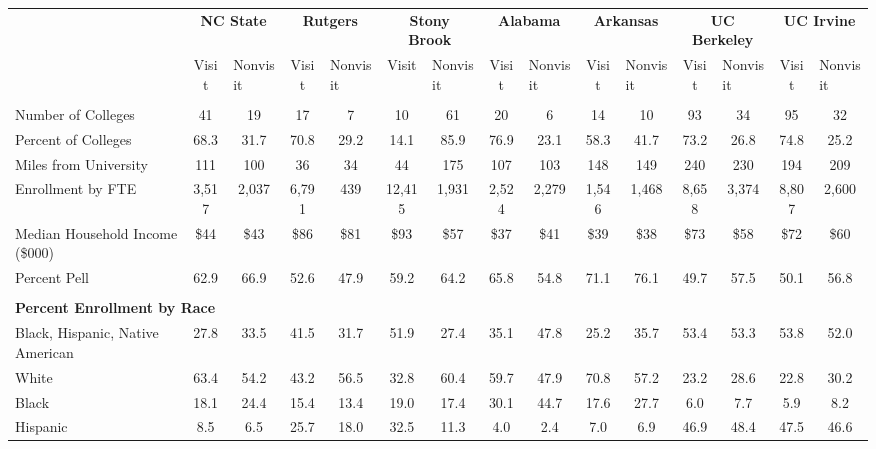 \begin{tabular*}{\linewidth}{@{\extracolsep{\fill} } lcccccccccccccc}%
&\multicolumn{2}{c}{\bfseries NC State}&\multicolumn{2}{c}{\bfseries Rutgers}&\multicolumn{2}{c}{\bfseries Stony Brook}&\multicolumn{2}{c}{\bfseries Alabama}&\multicolumn{2}{c}{\bfseries Arkansas}&\multicolumn{2}{c}{\bfseries UC Berkeley}&\multicolumn{2}{c}{\bfseries UC Irvine}\\%
&Visit&\multicolumn{1}{l}{Nonvisit}&Visit&\multicolumn{1}{l}{Nonvisit}&Visit&\multicolumn{1}{l}{Nonvisit}&Visit&\multicolumn{1}{l}{Nonvisit}&Visit&\multicolumn{1}{l}{Nonvisit}&Visit&\multicolumn{1}{l}{Nonvisit}&Visit&\multicolumn{1}{l}{Nonvisit}\\%
\hline%
&&&&&&&&&&&&&&\\%
\hspace{0cm}Number of Colleges&41&19&17&7&10&61&20&6&14&10&93&34&95&32\\%
Percent of Colleges&68.3&31.7&70.8&29.2&14.1&85.9&76.9&23.1&58.3&41.7&73.2&26.8&74.8&25.2\\%
\hspace{0cm}Miles from University&111&100&36&34&44&175&107&103&148&149&240&230&194&209\\%
\hspace{0cm}Enrollment by FTE&3,517&2,037&6,791&439&12,415&1,931&2,524&2,279&1,546&1,468&8,658&3,374&8,807&2,600\\%
\hspace{0cm}Median Household Income (\$000)&\$44&\$43&\$86&\$81&\$93&\$57&\$37&\$41&\$39&\$38&\$73&\$58&\$72&\$60\\%
\hspace{0cm}Percent Pell&62.9&66.9&52.6&47.9&59.2&64.2&65.8&54.8&71.1&76.1&49.7&57.5&50.1&56.8\\%
&&&&&&&&&&&&&&\\%
\multicolumn{15}{l}{\bfseries Percent Enrollment by Race}\\%
\hspace{0.2cm}Black, Hispanic, Native American&27.8&33.5&41.5&31.7&51.9&27.4&35.1&47.8&25.2&35.7&53.4&53.3&53.8&52.0\\%
\hspace{0.2cm}White&63.4&54.2&43.2&56.5&32.8&60.4&59.7&47.9&70.8&57.2&23.2&28.6&22.8&30.2\\%
\hspace{0.2cm}Black&18.1&24.4&15.4&13.4&19.0&17.4&30.1&44.7&17.6&27.7&6.0&7.7&5.9&8.2\\%
\hspace{0.2cm}Hispanic&8.5&6.5&25.7&18.0&32.5&11.3&4.0&2.4&7.0&6.9&46.9&48.4&47.5&46.6\\%

\end{tabular*}
